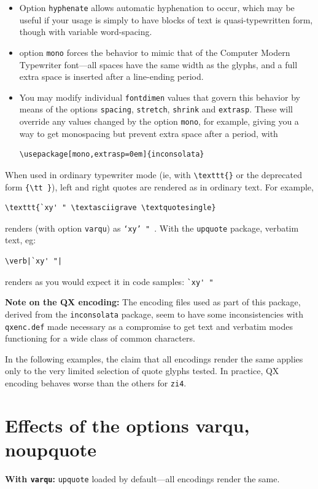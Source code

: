 \documentclass[11pt]{article}
\begin{document}
{\begin{itemize}
\begin{itemize}
\item
Option {\tt hyphenate} allows automatic hyphenation to occur, which may be useful if your usage is simply to have blocks of text is quasi-typewritten form, though with variable word-spacing.
\item option {\tt mono} forces the behavior to mimic that of the Computer Modern Typewriter font---all spaces have the same width as the glyphs, and a full extra space is inserted after a line-ending period.
\item You may modify individual {\tt fontdimen} values that govern this behavior by means of the options {\tt spacing}, {\tt stretch}, {\tt shrink} and {\tt extrasp}. These will override any values changed by the option {\tt mono}, for example, giving you a way to get monospacing but prevent extra space after a period, with
\begin{verbatim}
\usepackage[mono,extrasp=0em]{inconsolata}
\end{verbatim}
\end{itemize}
\end{itemize}
When used in ordinary typewriter mode (ie, with \verb|\texttt{}| or the deprecated form \verb|{\tt }|), left and right quotes are rendered as in ordinary text. For example, 
\begin{verbatim}
\texttt{`xy' " \textasciigrave \textquotesingle}
\end{verbatim}
renders (with option \texttt{varqu}) as \texttt{`xy' " \textasciigrave \textquotesingle}. With the \texttt{upquote} package, verbatim text, eg:
\begin{verbatim}
\verb|`xy' "|
\end{verbatim}
 renders as you would expect it in code samples:
\verb|`xy' "|

\textbf{Note on the QX encoding:} The encoding files used as part of this package, derived from the \texttt{inconsolata} package, seem to have some inconsistencies with \texttt{qxenc.def} made necessary as a compromise to get text and verbatim modes functioning for a wide class of common characters.

In the following examples, the claim that all encodings render the same applies only to the very limited selection of quote glyphs tested. In practice, QX encoding behaves worse than the others for \texttt{zi4}.


\section*{Effects of the options varqu, noupquote}
\textbf{With \texttt{varqu}:} \texttt{upquote} loaded by default---all encodings render the same.

}
\end{document}
